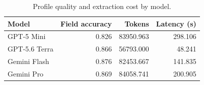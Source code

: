 \begin{table}[t]
\caption{Profile quality and extraction cost by model.}
\label{tab:rq2-model-cost}
\centering
\footnotesize
\setlength{\tabcolsep}{4pt}
\begin{tabular}{lrrr}
\toprule
Model & Field accuracy & Tokens & Latency (s) \\
\midrule
GPT-5 Mini & 0.826 & 83950.963 & 298.106 \\
GPT-5.6 Terra & 0.866 & 56793.000 & 48.241 \\
Gemini Flash & 0.876 & 82453.667 & 141.835 \\
Gemini Pro & 0.869 & 84058.741 & 200.905 \\
\bottomrule
\end{tabular}
\end{table}